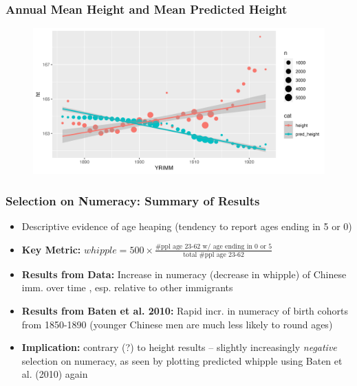 \documentclass[xcolor=dvipsnames, compress, 12pt, aspectratio=169, handout]{beamer}
\begin{document}
\begin{frame}
    \frametitle{Annual Mean Height and Mean Predicted Height}
    \begin{figure}
        \centering
        \includegraphics[width=\textwidth]{../../figs/5oct23/heightplot2.png}
    \end{figure}
\end{frame}

\begin{frame}
    \frametitle{Selection on Numeracy: Summary of Results}
    \label{whipple}
    \begin{itemize}
        \item Descriptive evidence of age heaping (tendency to report ages ending in 5 or 0) \hyperlink{agehist}{} \hyperlink{agehist_censusall}{} \hyperlink{agehist_census}{}
        \vspace{2mm}
        \item \textbf{Key Metric:} $whipple = 500 \times \frac{\text{\# ppl age 23-62 w/ age ending in 0 or 5}}{\text{total \# ppl age 23-62}}$ 
        \vspace{2mm}
        \item \textbf{Results from Data:} Increase in numeracy (decrease in whipple) of Chinese imm. over time \hyperlink{whippleplot1}{}, esp. relative to other immigrants \hyperlink{whippleplot3_census}{} \vspace{2mm}
        \item \textbf{Results from Baten et al. 2010:} Rapid incr. in numeracy of birth cohorts from 1850-1890 (younger Chinese men are much less likely to round ages) \hyperlink{batenwhipple}{} \vspace{2mm}
        \item \textbf{Implication:} contrary (?) to height results -- slightly increasingly \textit{negative} selection on numeracy, as seen by plotting predicted whipple using Baten et al. (2010) again
    \end{itemize}
\end{frame}
\end{document}
